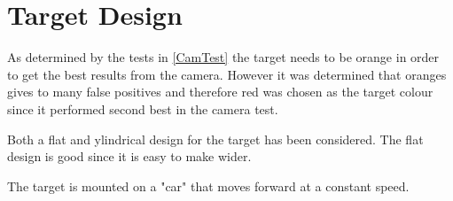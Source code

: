 \section{Target Design}
As determined by the tests in \autoref{CamTest} the target needs to be orange in
order to get the best results from the camera. However it was determined that
oranges gives to many false positives and therefore red was chosen as the target
colour since it performed second best in the camera test.\nl

Both a flat and ylindrical design for the target has been considered. The flat
design is good since it is easy to make wider. \nl

The target is mounted on a "car" that moves forward at a constant speed. 




